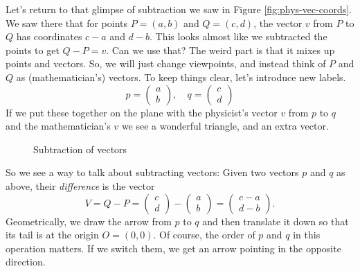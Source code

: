 \documentclass[00-livre-main.tex]{subfiles}
\begin{document}
Let's return to that glimpse of subtraction we saw in Figure \ref{fig:phys-vec-coords}.
We saw there that for points $P = (a,b)$ and $Q = (c,d)$, the vector $v$ from $P$ to $Q$ has coordinates $c-a$ and $d-b$.
This looks almost like we subtracted the points to get $Q-P = v$.
Can we use that?
The weird part is that it mixes up points and vectors.
So, we will just change viewpoints, and instead think of $P$ and $Q$ as (mathematician's) vectors. To keep things clear, let's introduce new labels.
\[
p = \begin{pmatrix} a \\ b \end{pmatrix}, \quad q = \begin{pmatrix} c \\ d \end{pmatrix}
\]
If we put these together on the plane with the physicist's vector $v$ from $p$ to $q$ and the mathematician's $v$ we see a wonderful triangle, and an extra vector.
\begin{figure}[h]
\centering
{}
\caption{Subtraction of vectors}
\label{fig:subtract-vec}
\end{figure}
So we see a way to talk about subtracting vectors: Given two vectors $p$ and $q$ as above, their
\emph{difference} is the vector
\[
V = Q-P = \begin{pmatrix} c \\ d \end{pmatrix} - \begin{pmatrix} a \\ b \end{pmatrix} = \begin{pmatrix} c-a \\ d-b \end{pmatrix}.
\]
Geometrically, we draw the arrow from $p$ to $q$ and then translate it down so that its tail is at the origin $O=(0,0)$. Of course, the order of $p$ and $q$ in this operation matters. If we switch them, we get an arrow pointing in the opposite direction.
\end{document}
